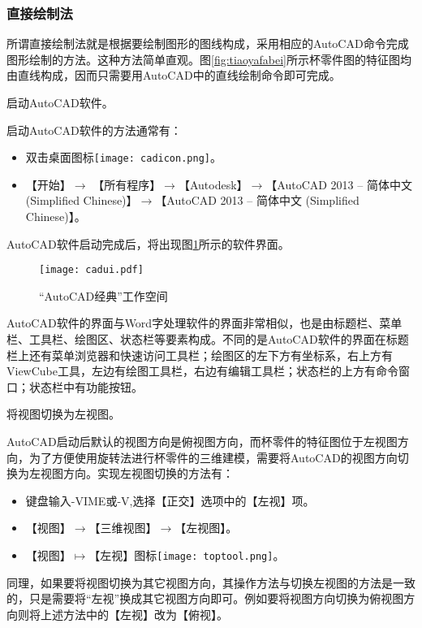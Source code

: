 \subsubsection{直接绘制法}\label{sec:beilingjianleft}
所谓直接绘制法就是根据要绘制图形的图线构成，采用相应的AutoCAD命令完成图形绘制的方法。这种方法简单直观。图\ref{fig:tiaoyafabei}所示杯零件图的特征图均由直线构成，因而只需要用AutoCAD中的直线绘制命令即可完成。
\begin{procedure}

\item 启动AutoCAD软件。

启动AutoCAD软件的方法通常有：
\begin{itemize}
\item 双击桌面图标\texttt{[image: cadicon.png]}。
\item 【开始】$\rightarrow$ 【所有程序】$\rightarrow$【Autodesk】$\rightarrow$【AutoCAD 2013 – 简体中文 (Simplified Chinese)】$\rightarrow$【AutoCAD 2013 – 简体中文 (Simplified Chinese)】。
\end{itemize}
AutoCAD软件启动完成后，将出现图\ref{fig:cadui}所示的软件界面。
\begin{figure}[htbp]
\centering
\texttt{[image: cadui.pdf]}
\caption{“AutoCAD经典”工作空间}\label{fig:cadui}
\end{figure}
AutoCAD软件的界面与Word字处理软件的界面非常相似，也是由标题栏、菜单栏、工具栏、绘图区、状态栏等要素构成。不同的是AutoCAD软件的界面在标题栏上还有菜单浏览器和快速访问工具栏；绘图区的左下方有坐标系，右上方有ViewCube工具，左边有绘图工具栏，右边有编辑工具栏；状态栏的上方有命令窗口；状态栏中有功能按钮。

\item 将视图切换为左视图。

AutoCAD启动后默认的视图方向是俯视图方向，而杯零件的特征图位于左视图方向，为了方便使用旋转法进行杯零件的三维建模，需要将AutoCAD的视图方向切换为左视图方向。实现左视图切换的方法有：
\begin{itemize}
\item 键盘输入-VIME或-V,选择【正交】选项中的【左视】项。
\item 【视图】$\rightarrow$【三维视图】$\rightarrow$【左视图】。
\item 【视图】$\mapsto$【左视】图标\texttt{[image: toptool.png]}。
\end{itemize}
同理，如果要将视图切换为其它视图方向，其操作方法与切换左视图的方法是一致的，只是需要将“左视”换成其它视图方向即可。例如要将视图方向切换为俯视图方向则将上述方法中的【左视】改为【俯视】。


\end{procedure}
